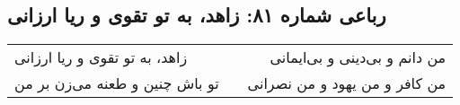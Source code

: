 \begin{center}
\section*{رباعی شماره ۸۱: زاهد، به تو تقوی و ریا ارزانی}
\label{sec:081}
\begin{longtable}{l p{0.5cm} r}
زاهد، به تو تقوی و ریا ارزانی
&&
من دانم و بی‌دینی و بی‌ایمانی
\\
تو باش چنین و طعنه می‌زن بر من
&&
من کافر و من یهود و من نصرانی
\\
\end{longtable}
\end{center}

